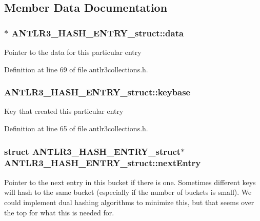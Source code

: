 \subsection{Member Data Documentation}
\hypertarget{struct_a_n_t_l_r3___h_a_s_h___e_n_t_r_y__struct_afc2e60867f757681c1d0c32582c0a4e5}{
\subsubsection[{data}]{$\ast$ A\-N\-T\-L\-R3\-\_\-\-H\-A\-S\-H\-\_\-\-E\-N\-T\-R\-Y\-\_\-struct\-::data}}\label{struct_a_n_t_l_r3___h_a_s_h___e_n_t_r_y__struct_afc2e60867f757681c1d0c32582c0a4e5}
Pointer to the data for this particular entry 

Definition at line 69 of file antlr3collections.\-h.

\hypertarget{struct_a_n_t_l_r3___h_a_s_h___e_n_t_r_y__struct_a4d8303b5c6bfcfb33c6db86c88915d37}{
\subsubsection[{keybase}]{ A\-N\-T\-L\-R3\-\_\-\-H\-A\-S\-H\-\_\-\-E\-N\-T\-R\-Y\-\_\-struct\-::keybase}}\label{struct_a_n_t_l_r3___h_a_s_h___e_n_t_r_y__struct_a4d8303b5c6bfcfb33c6db86c88915d37}
Key that created this particular entry 

Definition at line 65 of file antlr3collections.\-h.

\hypertarget{struct_a_n_t_l_r3___h_a_s_h___e_n_t_r_y__struct_a915d0ff5431c587100dbd7b93e19f6f6}{
\subsubsection[{next\-Entry}]{\setlength{\rightskip}{0pt plus 5cm}struct {\bf A\-N\-T\-L\-R3\-\_\-\-H\-A\-S\-H\-\_\-\-E\-N\-T\-R\-Y\-\_\-struct}$\ast$ A\-N\-T\-L\-R3\-\_\-\-H\-A\-S\-H\-\_\-\-E\-N\-T\-R\-Y\-\_\-struct\-::next\-Entry}}\label{struct_a_n_t_l_r3___h_a_s_h___e_n_t_r_y__struct_a915d0ff5431c587100dbd7b93e19f6f6}
Pointer to the next entry in this bucket if there is one. Sometimes different keys will hash to the same bucket (especially if the number of buckets is small). We could implement dual hashing algorithms to minimize this, but that seems over the top for what this is needed for. 

